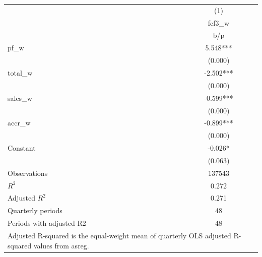 {
\def\sym#1{\ifmmode^{#1}\else\(^{#1}\)\fi}
\begin{tabular}{l*{1}{c}}
\hline\hline
                    &\multicolumn{1}{c}{(1)}\\
                    &\multicolumn{1}{c}{fcf3\_w}\\
                    &         b/p   \\
\hline
pf\_w                &       5.548***\\
                    &     (0.000)   \\
total\_w             &      -2.502***\\
                    &     (0.000)   \\
sales\_w             &      -0.599***\\
                    &     (0.000)   \\
accr\_w              &      -0.899***\\
                    &     (0.000)   \\
Constant            &      -0.026*  \\
                    &     (0.063)   \\
\hline
Observations        &      137543   \\
\(R^{2}\)           &       0.272   \\
Adjusted \(R^{2}\)  &       0.271   \\
Quarterly periods   &          48   \\
Periods with adjusted R2&          48   \\
\hline\hline
\multicolumn{2}{l}{\footnotesize Adjusted R-squared is the equal-weight mean of quarterly OLS adjusted R-squared values from asreg.}\\
\end{tabular}
}
